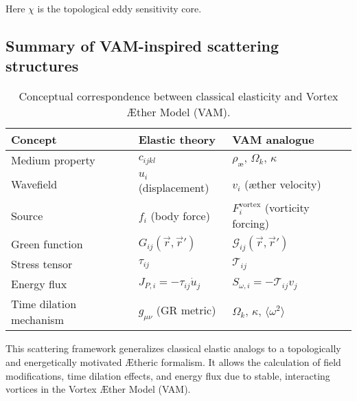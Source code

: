 Here \(\chi\) is the topological eddy sensitivity core.
\subsection{Summary of VAM-inspired scattering structures}

\begin{table}[H]
    \centering
    \begin{tabular}{lll}
        \toprule
    \textbf{Concept} & \textbf{Elastic theory} & \textbf{VAM analogue} \\
    \midrule
    Medium property & \( c_{ijkl} \) & \( \rho_\text{\ae},\, \Omega_k,\, \kappa \) \\
    Wavefield & \( u_i \) (displacement) & \( v_i \) (æther velocity) \\
    Source & \( f_i \) (body force) & \( F_i^\text{vortex} \) (vorticity forcing) \\
    Green function & \( G_{ij}(\vec{r}, \vec{r}') \) & \( \mathcal{G}_{ij}(\vec{r}, \vec{r}') \) \\
    Stress tensor & \( \tau_{ij} \) & \( \mathcal{T}_{ij} \) \\
    Energy flux & \( J_{P,i} = -\tau_{ij} \dot{u}_j \) & \( S_{\omega,i} = -\mathcal{T}_{ij} v_j \) \\
    Time dilation mechanism & \( g_{\mu\nu} \) (GR metric) & \( \Omega_k,\, \kappa,\, \langle \omega^2 \rangle \) \\
    \bottomrule
    \end{tabular}
    \caption{Conceptual correspondence between classical elasticity and Vortex Æther Model (VAM).}
    \label{tab:elastic-vam-analogy}
\end{table}

This scattering framework generalizes classical elastic analogs to a topologically and energetically motivated Ætheric formalism. It allows the calculation of field modifications, time dilation effects, and energy flux due to stable, interacting vortices in the Vortex Æther Model (VAM).

